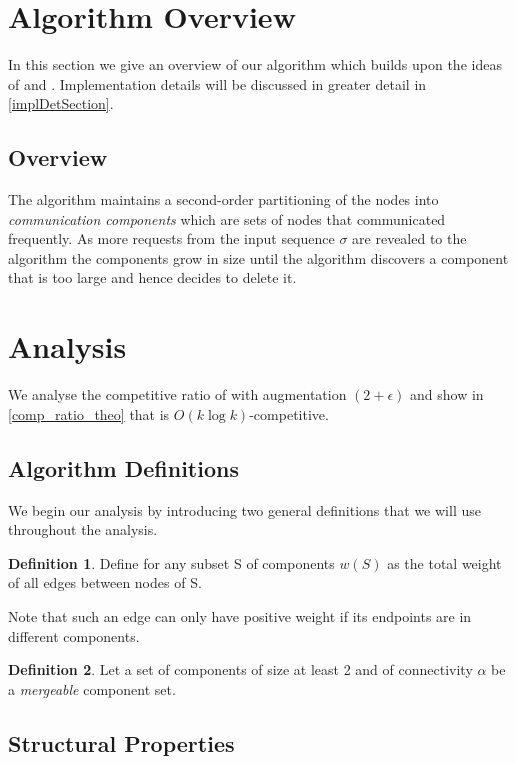 \documentclass[a4paper,xcolor=dvipsnames, tikz, 12pt]{article}
\newcommand{\crep}{\text{C{\scriptsize REP}}}
\theoremstyle{definition}
\newtheorem{defi}{Definition}
\begin{document}
	
	
	\section{Algorithm Overview}
	In this section we give an overview of our algorithm \crep{} which builds upon the ideas of \cite{Avin2015} and \cite{Avin2015a}. Implementation details will be discussed in greater detail in \cref{implDetSection}.
	
	\subsection{Overview}
	The algorithm maintains a second-order partitioning of the nodes into \textit{communication components} which are sets of nodes that communicated frequently. As more requests from the input sequence $\sigma$ are revealed to the algorithm the components grow in size until the algorithm discovers a component that is too large and hence decides to delete it.
	
	

\section{Analysis}
We analyse the competitive ratio of \crep{} with augmentation $(2+\epsilon)$ and show in \cref{comp_ratio_theo} that \crep{} is $O(k\log k)$-competitive.
\label{analysisSection}

\subsection{Algorithm Definitions}
We begin our analysis by introducing two general definitions that we will use throughout the analysis.

\begin{defi}
	Define for any subset S of components $w(S)$ as the total weight of all edges between nodes of S.
\end{defi}

Note that such an edge can only have positive weight if its endpoints are in different components.

\begin{defi}
	Let a set of components of size at least 2 and of connectivity $\alpha$ be a \textit{mergeable} component set.	
\end{defi}


\subsection{Structural Properties}
\end{document}
